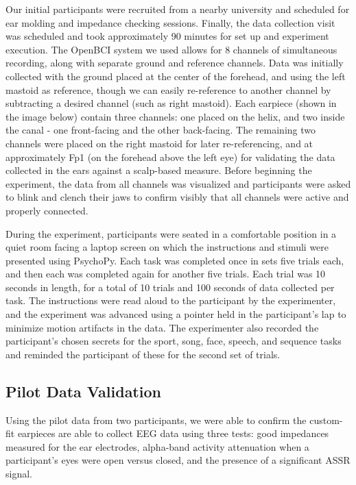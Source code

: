 \documentclass[11pt]{article}
\begin{document}
Our initial participants were recruited from a nearby university and scheduled for ear molding
and impedance checking sessions. Finally, the data collection visit was scheduled and took
approximately 90 minutes for set up and experiment execution. The OpenBCI system we used
allows for 8 channels of simultaneous recording, along with separate ground and reference channels.
Data was initially collected with the ground placed at the center of the forehead, and using the left
mastoid as reference, though we can easily re-reference to another channel by subtracting a desired
channel (such as right mastoid). Each earpiece (shown in the image below) contain three channels: 
one placed on the helix, and two inside the canal - one front-facing and the other back-facing. The remaining
two channels were placed on the right mastoid for later re-referencing, and at approximately Fp1 (on the 
forehead above the left eye) for validating the data collected in the ears against a scalp-based measure. 
Before beginning the experiment, the data from all channels was visualized and participants were asked to
blink and clench their jaws to confirm visibly that all channels were active and properly connected.

During the experiment, participants were seated in a comfortable position in a quiet room facing a laptop screen on which the
instructions and stimuli were presented using PsychoPy. Each task was completed once in sets five trials each, and then
each was completed again for another five trials. Each trial was 10 seconds in length, for a total of 10 trials and 
100 seconds of data collected per task. The instructions were read aloud to the participant by the experimenter, and
the experiment was advanced using a pointer held in the participant's lap to minimize motion artifacts in the data.  
The experimenter also recorded the participant's chosen secrets for the sport, song, face, speech, and sequence
 tasks and reminded the participant of these for the second set of trials.

\subsection{Pilot Data Validation}
\label{sec:org28f05cd}

Using the pilot data from two participants, we were able to confirm the custom-fit earpieces are able to collect EEG
data using three tests: good impedances measured for the ear electrodes, alpha-band activity attenuation when a
participant's eyes were open versus closed, and the presence of a significant ASSR signal.
\end{document}
